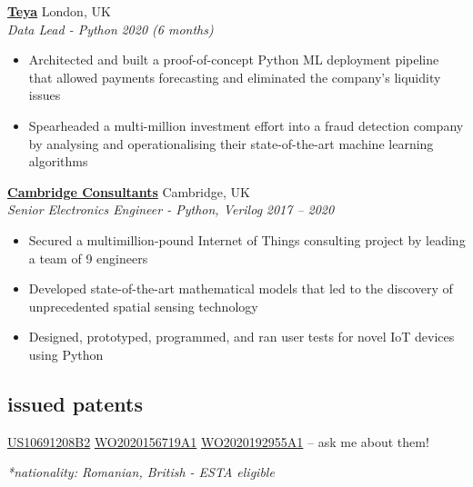 \documentclass[12pt]{article}
\newcommand{\entry}[4]{{{\textbf{#1}}} \hfill #3 \\ #2 \hfill #4}
\begin{document}
    \smallskip
    \entry{\href{https://teya.com}{Teya}}{\textit{Data Lead - Python}}{London, UK}{\textit{2020 (6 months)}}
    \begin{itemize}[noitemsep,leftmargin=6mm,rightmargin=0mm,topsep=0pt]
        \item Architected and built a proof-of-concept Python ML deployment pipeline that allowed payments forecasting and eliminated the company’s liquidity issues
        \item Spearheaded a multi-million investment effort into a fraud detection company by analysing and operationalising their state-of-the-art machine learning algorithms
    \end{itemize}

    \smallskip
    \entry{\href{https://www.cambridgeconsultants.com/home}{Cambridge Consultants}}{\textit{Senior Electronics Engineer - Python, Verilog}}{Cambridge, UK}{\textit{2017 -- 2020}}
    \begin{itemize}[noitemsep,leftmargin=6mm,rightmargin=0mm,topsep=0pt]
        \item Secured a multimillion-pound Internet of Things consulting project by leading a team of 9 engineers
        \item Developed state-of-the-art mathematical models that led to the discovery of unprecedented spatial sensing technology
        \item Designed, prototyped, programmed, and ran user tests for novel IoT devices using Python
    \end{itemize}

    \bigskip

    \begin{paracol}{2}
        \section{issued patents}
        \switchcolumn
        \bigskip
        \medskip
        \href{https://patents.google.com/patent/US10691208B2/en?inventor=silviu+toma}{US10691208B2}
        \textperiodcentered{}
        \href{https://patents.google.com/patent/WO2020156719A1/en?inventor=silviu+toma}{WO2020156719A1}
        \textperiodcentered{}
        \href{https://patents.google.com/patent/WO2020192955A1/en?inventor=silviu+toma}{WO2020192955A1}
        -- ask me about them!

    \end{paracol}


\vfill %
\raggedright %
\footnotesize \textit{*nationality: Romanian, British - ESTA eligible}%
\end{document}
